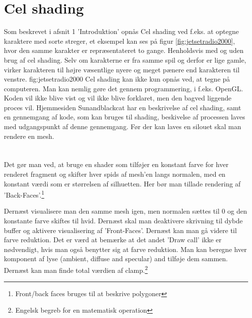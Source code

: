 \section{Cel shading}
Som beskrevet i afsnit 1 'Introduktion' opnås Cel shading ved f.eks. at optegne karaktere med sorte streger, et eksempel kan ses på figur \ref{fig:jetsetradio2000}, hvor den samme karakter er repræsentateret to gange. Henholdsvis med og uden brug af cel shading. Selv om karakterne er fra samme spil og derfor er lige gamle, virker karakteren til højre væsentlige nyere og meget pænere end karakteren til venstre.  {fig:jetsetradio2000}
Cel shading kan ikke kun opnås ved, at tegne på computeren. Man kan nemlig gøre det gennem programmering, i f.eks. OpenGL. Koden vil ikke blive vist og vil ikke blive forklaret, men den bagved liggende proces vil. Hjemmesiden Sunandblackcat \cite{sunandblackcat2016} har en beskrivelse af cel shading, samt en gennemgang af kode, som kan bruges til shading, beskivelse af processen laves med udgangspunkt af denne gennemgang. Før der kan laves en silouet skal man rendere en mesh.\\\\\\Det gør man ved, at bruge en shader som tilføjer en konstant farve for hver renderet fragment og skifter hver spids af mesh’en langs normalen, med en konstant værdi som er størrelsen af silhuetten. Her bør man tillade rendering af ’Back-Faces’.\footnote[1]{Front/back faces bruges til at beskrive polygoner}

Dernæst visualisere man den samme mesh igen, men normalen sættes til 0 og den konstante farve skiftes til hvid.  Dernæst skal man deaktivere skrivning til dybde buffer og aktivere visualisering af ’Front-Faces’. Dernæst kan man gå videre til farve reduktion. Det er værd at bemærke at det andet ’Draw call’ ikke er nødvendigt, hvis man også benytter sig at farve reduktion. 
Man kan beregne hver komponent af lyse (ambient, diffuse and specular) and tilføje dem sammen. Dernæst kan man finde total værdien af clamp.\footnote[2]{Engelsk begreb for en matematisk operation}

